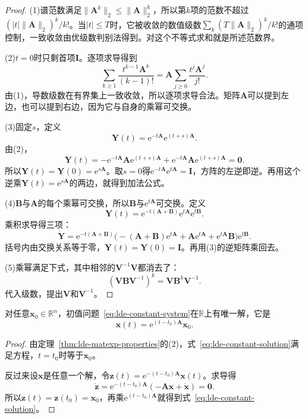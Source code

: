 \begin{proof}
(1)谱范数满足$\lVert\bm{A}^k\rVert_2\leq\lVert\bm{A}\rVert_2^k$，所以第$k$项的范数不超过$(\lvert t\rvert\lVert\bm{A}\rVert_2)^k/k!$。当$\lvert t\rvert\leq T$时，它被收敛的数值级数$\sum_k(T\lVert\bm{A}\rVert_2)^k/k!$的通项控制，一致收敛由优级数判别法得到。对这个不等式求和就是所述范数界。

(2)$t=0$时只剩首项$\bm{I}$。逐项求导得到
\[
 \sum_{k\geq1}\frac{t^{k-1}\bm{A}^k}{(k-1)!}=\bm{A}\sum_{j\geq0}\frac{t^{j}\bm{A}^{j}}{j!}.
\]
由(1)，导数级数在有界集上一致收敛，所以逐项求导合法。矩阵$\bm{A}$可以提到左边，也可以提到右边，因为它与自身的乘幂可交换。

(3)固定$s$，定义
\[
 \bm{Y}(t)=\mathrm{e}^{-t\bm{A}}\mathrm{e}^{(t+s)\bm{A}}.
\]
由(2)，
\[
 \dot{\bm{Y}}(t)=-\mathrm{e}^{-t\bm{A}}\bm{A}\mathrm{e}^{(t+s)\bm{A}}+\mathrm{e}^{-t\bm{A}}\bm{A}\mathrm{e}^{(t+s)\bm{A}}=\bm{0}.
\]
所以$\bm{Y}(t)=\bm{Y}(0)=\mathrm{e}^{s\bm{A}}$。取$s=0$得$\mathrm{e}^{-t\bm{A}}\mathrm{e}^{t\bm{A}}=\bm{I}$，方阵的左逆即逆。再用这个逆乘$\bm{Y}(t)=\mathrm{e}^{s\bm{A}}$的两边，就得到加法公式。

(4)$\bm{B}$与$\bm{A}$的每个乘幂可交换，所以$\bm{B}$与$\mathrm{e}^{t\bm{A}}$可交换。定义
\[
 \bm{Y}(t)=\mathrm{e}^{-t(\bm{A}+\bm{B})}\mathrm{e}^{t\bm{A}}\mathrm{e}^{t\bm{B}}.
\]
乘积求导得三项：
\[
 \dot{\bm{Y}}=\mathrm{e}^{-t(\bm{A}+\bm{B})}\bigl(-(\bm{A}+\bm{B})\mathrm{e}^{t\bm{A}}+\bm{A}\mathrm{e}^{t\bm{A}}+\mathrm{e}^{t\bm{A}}\bm{B}\bigr)\mathrm{e}^{t\bm{B}}.
\]
括号内由交换关系等于零，$\bm{Y}(t)=\bm{Y}(0)=\bm{I}$。再用(3)的逆矩阵乘回去。

(5)乘幂满足下式，其中相邻的$\bm{V}^{-1}\bm{V}$都消去了：
\[
 (\bm{V}\bm{B}\bm{V}^{-1})^k=\bm{V}\bm{B}^k\bm{V}^{-1}.
\]
代入级数，提出$\bm{V}$和$\bm{V}^{-1}$。
\end{proof}

\begin{theorem}[常系数齐次系统的解]
\label{thm:lde-constant-solution}
对任意$\bm{x}_0\in\mathbb{R}^n$，初值问题~\eqref{eq:lde-constant-system}在$\mathbb{R}$上有唯一解，它是
\begin{equation}
 \bm{x}(t)=\mathrm{e}^{(t-t_0)\bm{A}}\bm{x}_0.
 \label{eq:lde-constant-solution}
\end{equation}
\end{theorem}

\begin{proof}
由定理~\ref{thm:lde-matexp-properties}的(2)，式~\eqref{eq:lde-constant-solution}满足方程，$t=t_0$时等于$\bm{x}_0$。

反过来设$\bm{x}$是任意一个解，令$\bm{z}(t)=\mathrm{e}^{-(t-t_0)\bm{A}}\bm{x}(t)$。求导得
\[
 \dot{\bm{z}}=\mathrm{e}^{-(t-t_0)\bm{A}}(-\bm{A}\bm{x}+\dot{\bm{x}})=\bm{0}.
\]
所以$\bm{z}(t)=\bm{z}(t_0)=\bm{x}_0$，再乘$\mathrm{e}^{(t-t_0)\bm{A}}$就得到式~\eqref{eq:lde-constant-solution}。
\end{proof}


